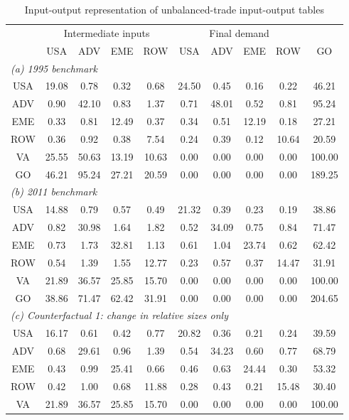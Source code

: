 \begin{table}[p]
\renewcommand{\arraystretch}{1.2}
\begin{center}
\caption{Input-output representation of unbalanced-trade input-output tables}
\label{tab:iomat-bench}
\small
\begin{tabular}{cccccccccc}
\toprule
& \multicolumn{4}{c}{Intermediate inputs}& \multicolumn{4}{c}{Final demand} & \\
\cmidrule(rl){2-5}\cmidrule(rl){6-9}
 &USA &ADV &EME &ROW &USA &ADV &EME &ROW& GO\\
\midrule
\multicolumn{10}{l}{\textit{(a) 1995 benchmark}} \\
USA& 19.08& 0.78& 0.32& 0.68& 24.50& 0.45& 0.16& 0.22& 46.21 \\
ADV& 0.90& 42.10& 0.83& 1.37& 0.71& 48.01& 0.52& 0.81& 95.24 \\
EME& 0.33& 0.81& 12.49& 0.37& 0.34& 0.51& 12.19& 0.18& 27.21 \\
ROW& 0.36& 0.92& 0.38& 7.54& 0.24& 0.39& 0.12& 10.64& 20.59 \\
VA& 25.55& 50.63& 13.19& 10.63& 0.00& 0.00& 0.00& 0.00& 100.00\\
GO& 46.21& 95.24& 27.21& 20.59& 0.00& 0.00& 0.00& 0.00& 189.25\\
\midrule
\multicolumn{10}{l}{\textit{(b) 2011 benchmark}}\\
USA& 14.88& 0.79& 0.57& 0.49& 21.32& 0.39& 0.23& 0.19& 38.86 \\
ADV& 0.82& 30.98& 1.64& 1.82& 0.52& 34.09& 0.75& 0.84& 71.47 \\
EME& 0.73& 1.73& 32.81& 1.13& 0.61& 1.04& 23.74& 0.62& 62.42 \\
ROW& 0.54& 1.39& 1.55& 12.77& 0.23& 0.57& 0.37& 14.47& 31.91 \\
VA& 21.89& 36.57& 25.85& 15.70& 0.00& 0.00& 0.00& 0.00& 100.00\\
GO& 38.86& 71.47& 62.42& 31.91& 0.00& 0.00& 0.00& 0.00& 204.65\\
\midrule
\multicolumn{10}{l}{\textit{(c) Counterfactual 1: change in relative sizes only}}\\
USA& 16.17& 0.61& 0.42& 0.77& 20.82& 0.36& 0.21& 0.24& 39.59 \\
ADV& 0.68& 29.61& 0.96& 1.39& 0.54& 34.23& 0.60& 0.77& 68.79 \\
EME& 0.43& 0.99& 25.41& 0.66& 0.46& 0.63& 24.44& 0.30& 53.32 \\
ROW& 0.42& 1.00& 0.68& 11.88& 0.28& 0.43& 0.21& 15.48& 30.40 \\
VA& 21.89& 36.57& 25.85& 15.70& 0.00& 0.00& 0.00& 0.00& 100.00\\

\end{tabular}
\end{center}
\end{table}
